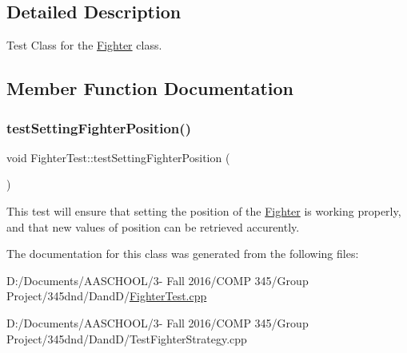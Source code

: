 \subsection{Detailed Description}
Test Class for the \hyperlink{class_fighter}{Fighter} class. 

\subsection{Member Function Documentation}
\hypertarget{class_fighter_test_a751fd0a97704e1101eb58f4493681696}{}\label{class_fighter_test_a751fd0a97704e1101eb58f4493681696} 
\subsubsection{\texorpdfstring{test\+Setting\+Fighter\+Position()}{testSettingFighterPosition()}}
{\footnotesize\ttfamily void Fighter\+Test\+::test\+Setting\+Fighter\+Position (\begin{DoxyParamCaption}{ }\end{DoxyParamCaption})\hspace{0.3cm}{\ttfamily [protected]}}

This test will ensure that setting the position of the \hyperlink{class_fighter}{Fighter} is working properly, and that new values of position can be retrieved accurently. 

The documentation for this class was generated from the following files\+:\begin{DoxyCompactItemize}
\item 
D\+:/\+Documents/\+A\+A\+S\+C\+H\+O\+O\+L/3-\/ Fall 2016/\+C\+O\+M\+P 345/\+Group Project/345dnd/\+Dand\+D/\hyperlink{_fighter_test_8cpp}{Fighter\+Test.\+cpp}\item 
D\+:/\+Documents/\+A\+A\+S\+C\+H\+O\+O\+L/3-\/ Fall 2016/\+C\+O\+M\+P 345/\+Group Project/345dnd/\+Dand\+D/Test\+Fighter\+Strategy.\+cpp\end{DoxyCompactItemize}
